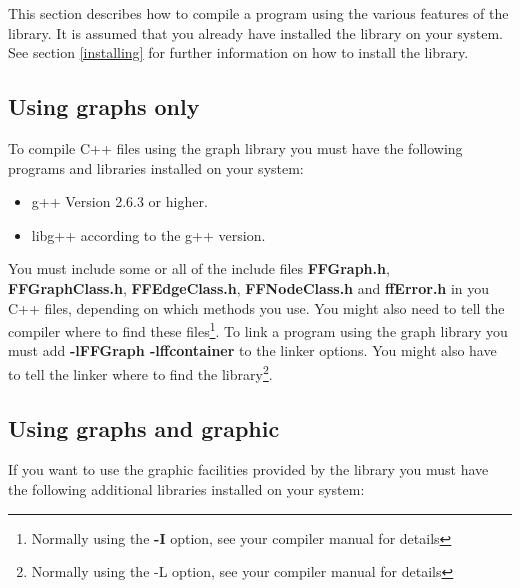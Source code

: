 
This section describes how to compile a program using the
various features of the library. It is assumed that you already
have installed the library on your system. See section
\vref{installing} for further
information on how to install the library.

\subsection{Using graphs only}
\label{using_graphs_only}

To compile C++ files using the graph library you must have the
following programs and libraries installed on your system:

\begin{itemize}

\item 
g++ Version 2.6.3 or higher.

\item
libg++ according to the g++ version.

\end{itemize}

You must include some or all of the include files {\bf
  FFGraph.h}, { \bf FFGraphClass.h}, {\bf FFEdgeClass.h}, {\bf
  FFNodeClass.h} and {\bf ffError.h} in you C++ files, depending
on which methods you use. You might also need to tell the
compiler where to find these files\footnote{Normally using the
  {\bf -I} option, see your compiler manual for details}. To link
a program using the graph library you must add {\bf -lFFGraph
  -lffcontainer} to the linker options. You might also have to
tell the linker where to find the library\footnote{Normally using
  the -L option, see your compiler manual for details}.

\subsection{Using graphs and graphic}
\label{using_graphs_and_graphic}

If you want to use the graphic facilities provided by the library
you must have the following additional libraries installed on
your system:

